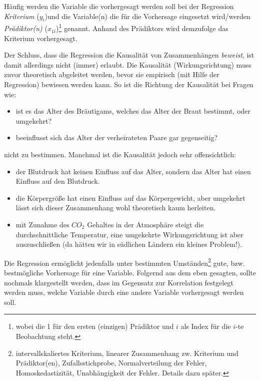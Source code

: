 \documentclass[]{article}
\providecommand{\tightlist}{%
  \setlength{\itemsep}{0pt}\setlength{\parskip}{0pt}}
\let\rmarkdownfootnote\footnote%
\def\footnote{\protect\rmarkdownfootnote}
\begin{document}
Häufig werden die Variable die vorhergesagt werden soll bei der
Regression \emph{Kriterium} (\(y_i\))und die Variable(n) die für die
Vorhersage eingesetzt wird/werden \emph{Prädiktor(n)}
(\(x_{1i}\))\footnote{wobei die 1 für den ersten (einzigen) Prädiktor
  und \(i\) als Index für die \(i\)-te Beobachtung steht.} genannt.
Anhand des Prädiktors wird demzufolge das Kriterium vorhergesagt.

Der Schluss, dass die Regression die Kausalität von Zusammenhängen
\emph{beweist}, ist damit allerdings nicht (immer) erlaubt. Die
Kausalität (Wirkungsrichtung) muss zuvor theoretisch abgeleitet werden,
bevor sie empirisch (mit Hilfe der Regression) bewiesen werden kann. So
ist die Richtung der Kausalität bei Fragen wie:

\begin{itemize}
\tightlist
\item
  ist es das Alter des Bräutigams, welches das Alter der Braut bestimmt,
  oder umgekehrt?
\item
  beeinflusst sich das Alter der verheirateten Paare gar gegenseitig?
\end{itemize}

nicht zu bestimmen. Manchmal ist die Kausalität jedoch sehr
offensichtlich:

\begin{itemize}
\tightlist
\item
  der Blutdruck hat keinen Einfluss auf das Alter, sondern das Alter hat
  einen Einfluss auf den Blutdruck.
\item
  die Körpergröße hat einen Einfluss auf das Körpergewicht, aber
  umgekehrt lässt sich dieser Zusammenhang wohl theoretisch kaum
  herleiten.
\item
  mit Zunahme des \(CO_2\) Gehaltes in der Atmosphäre steigt die
  durchschnittliche Temperatur, eine umgekehrte Wirkungsrichtung ist
  aber auszuschließen (da hätten wir in südlichen Ländern ein kleines
  Problem!).
\end{itemize}

Die Regression ermöglicht jedenfalls unter bestimmten
Umständen\footnote{intervallskaliertes Kriterium, linearer Zusammenhang
  zw. Kriterium und Prädiktor(en), Zufallsstichprobe, Normalverteilung
  der Fehler, Homoskedastizität, Unabhängigkeit der Fehler. Details dazu
  später.} gute, bzw. bestmögliche Vorhersage für eine Variable.
Folgernd aus dem eben gesagten, sollte nochmals klargestellt werden,
dass im Gegensatz zur Korrelation festgelegt werden muss, welche
Variable durch eine andere Variable vorhergesagt werden soll.
\end{document}
